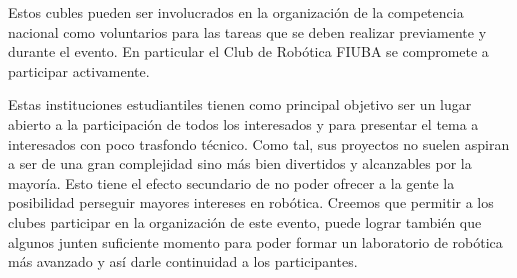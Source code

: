 \documentclass[a4paper,12pt]{article}
\begin{document}
Estos cubles pueden ser involucrados en la organización de la competencia nacional como voluntarios para las tareas que se deben realizar previamente y durante el evento. En particular el Club de Robótica FIUBA se compromete a participar activamente.

Estas instituciones estudiantiles tienen como principal objetivo ser un lugar abierto a la participación de todos los interesados y para presentar el tema a interesados con poco trasfondo técnico. Como tal, sus proyectos no suelen aspiran a ser de una gran complejidad sino más bien divertidos y alcanzables por la mayoría. Esto tiene el efecto secundario de no poder ofrecer a la gente la posibilidad perseguir mayores intereses en robótica. Creemos que permitir a los clubes participar en la organización de este evento, puede lograr también que algunos junten suficiente momento para poder formar un laboratorio de robótica más avanzado y así darle continuidad a los participantes.
\end{document}
